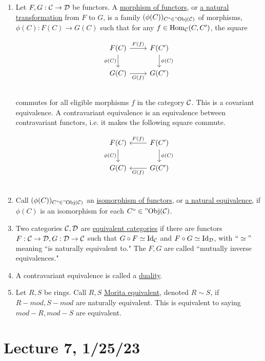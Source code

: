 \documentclass[x11names,reqno,14pt]{extarticle}
\newcommand{\fin}{``\in"}
\begin{document}
\begin{enumerate}
\item Let $F, G:\mathcal{C}\to\mathcal{D}$ be functors. A \underline{morphism of functors}, or \underline{a natural transformation} from $F$ to $G$, is a family $(\phi(C))_{C\fin\Obj(\mc{C})}$ of morphisms, $\phi(C):F(C)\to G(C)$ such that for any $f \in {\mathrm{Hom}}_{\mathcal{C}}(C, C')$, the square

\[
\begin{tikzcd}
\ar[d, "\phi(C)"']F(C)\ar[r,"F(f)"] & F(C')\ar[d, "\phi(C)"] \\
G(C)\ar[r, "G(f)"']& G(C') \\
\end{tikzcd}
\]
commutes for all eligible morphisms $f$ in the category $\mathcal{C}$. This is a covariant equivalence. A contravariant equivalence is an equivalence between contravariant functors, i.e. it makes the following square commute. 

\[
\begin{tikzcd}
\ar[d, "\phi(C)"']F(C) & \ar[l, "F(f)"']F(C')\ar[d, "\phi(C)"] \\
G(C)&\ar[l, "G(f)"] G(C') \\
\end{tikzcd}
\]

\item Call $(\phi(C))_{C\fin\Obj(\mc{C})}$ an \underline{isomorphism of functors}, or \underline{a natural equivalence}, if $\phi(C)$ is an isomorphism for each $C\fin\Obj(\mc{C})$. 

\item Two categories $\mathcal{C}, \mathcal{D}$ are \underline{equivalent categories} if there are functors $F:\mathcal{C}\to\mathcal{D}, G:\mathcal{D}\to\mathcal{C}$ such that $G \circ F \simeq \operatorname{\mathrm{Id}}_{\mathcal{C}}$ and $F \circ G \simeq \operatorname{\mathrm{Id}}_{\mathcal{D}}$, with $``\simeq"$ meaning ``is naturally equivalent to." The $F, G$ are called ``mutually inverse equivalences."

\item A contravariant equivalence is called a \underline{duality}.

\item Let $R, S$ be rings. Call $R, S$ \underline{Morita equivalent}, denoted $R \sim S$, if $R-mod, S-mod$ are naturally equivalent. This is equivalent to saying $mod-R, mod-S$ are equivalent. 

\end{enumerate}

\section*{Lecture 7, 1/25/23}
\end{document}
